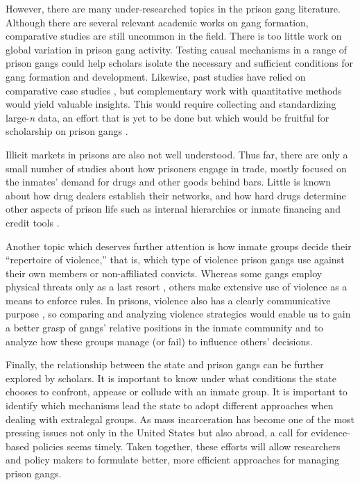\documentclass[a4paper, 12pt]{article}
\begin{document}
However, there are many under-researched topics in the prison gang literature. Although there are several relevant academic works on gang formation, comparative studies are still uncommon in the field. There is too little work on global variation in prison gang activity. Testing causal mechanisms in a range of prison gangs could help scholars isolate the necessary and sufficient conditions for gang formation and development. Likewise, past studies have relied on comparative case studies \citep{skarbek2016global}, but complementary work with quantitative methods would yield valuable insights. This would require collecting and standardizing large-\textit{n} data, an effort that is yet to be done but which would be fruitful for scholarship on prison gangs \citep{fleisher2001overview}.

Illicit markets in prisons are also not well understood. Thus far, there are only a small number of studies about how prisoners engage in trade, mostly focused on the inmates' demand for drugs and other goods behind bars. Little is known about how drug dealers establish their networks, and how hard drugs determine other aspects of prison life such as internal hierarchies or inmate financing and credit tools \citep[p. 348]{crewe2006prison}. 

Another topic which deserves further attention is how inmate groups decide their ``repertoire of violence,'' that is, which type of violence prison gangs use against their own members or non-affiliated convicts. Whereas some gangs employ physical threats only as a last resort \citep{crewe2006prison,trammell2012enforcing}, others make extensive use of violence as a means to enforce rules. In prisons, violence also has a clearly communicative purpose \citep{gambetta2009codes}, so comparing and analyzing violence strategies would enable us to gain a better grasp of gangs' relative positions in the inmate community and to analyze how these groups manage (or fail) to influence others' decisions.

Finally, the relationship between the state and prison gangs can be further explored by scholars. It is important to know under what conditions the state chooses to confront, appease or collude with an inmate group. It is important to identify which mechanisms lead the state to adopt different approaches when dealing with extralegal groups. As mass incarceration has become one of the most pressing issues not only in the United States but also abroad, a call for evidence-based policies seems timely. Taken together, these efforts will allow researchers and policy makers to formulate better, more efficient approaches for managing prison gangs.



\end{document}

